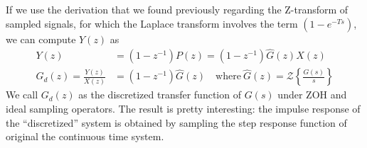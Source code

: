 \documentclass[twoside]{article}
\begin{document}
%
If we use the derivation that we found previously regarding the 
Z-transform of sampled signals, for which the Laplace transform involves the 
term $\left( 1 - e^{-T s} \right)$, we can compute $Y(z)$ as 
% 
\begin{align*}
Y(z) &= \left( 1 - z^{-1} \right) P(z) = \left( 1 - z^{-1} \right) 
\hat{G}(z) X(z)
\\
G_d(z) = \frac{Y(z)}{X(z)} &= \left( 1 - z^{-1} \right) \hat{G}(z) \quad \mathrm{where} \ \hat{G}(z) = \mathcal{Z} \left\lbrace 
\frac{G(s)}{s} \right\rbrace
\end{align*}
%
We call $G_d(z)$ as the discretized transfer function of $G(s)$
under ZOH and ideal sampling operators. The result is pretty interesting: the impulse response of the
``discretized'' system is obtained by sampling the step response function of original the 
continuous time system. 


\end{document}

